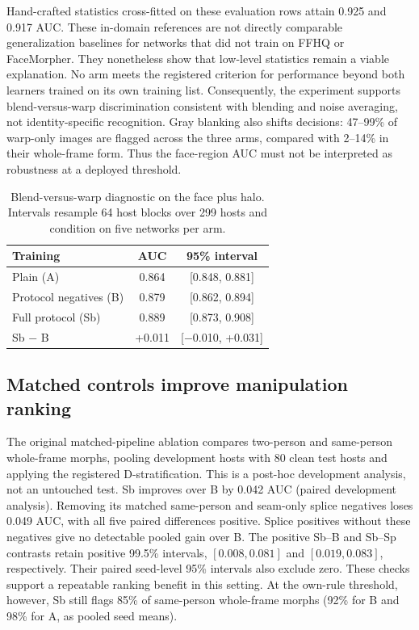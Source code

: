     Hand-crafted statistics cross-fitted on these evaluation rows attain 0.925 and 0.917 AUC. These in-domain references are not directly comparable generalization baselines for networks that did not train on FFHQ or FaceMorpher. They nonetheless show that low-level statistics remain a viable explanation. No arm meets the registered criterion for performance beyond both learners trained on its own training list. Consequently, the experiment supports blend-versus-warp discrimination consistent with blending and noise averaging, not identity-specific recognition. Gray blanking also shifts decisions: 47--99\% of warp-only images are flagged across the three arms, compared with 2--14\% in their whole-frame form. Thus the face-region AUC must not be interpreted as robustness at a deployed threshold.
    
    \begin{table}[t]
    \centering\small
    \caption{Blend-versus-warp diagnostic on the face plus halo. Intervals resample 64 host blocks over 299 hosts and condition on five networks per arm.}
    \label{tab:blend_controls}
    \begin{tabular}{lcc}
    \toprule
    Training & AUC & 95\% interval \\
    \midrule
    Plain (A) & 0.864 & [0.848, 0.881] \\
    Protocol negatives (B) & 0.879 & [0.862, 0.894] \\
    Full protocol (Sb) & 0.889 & [0.873, 0.908] \\
    \midrule
    Sb $-$ B & +0.011 & [$-$0.010, +0.031] \\
    \bottomrule
    \end{tabular}
    \end{table}
    
    \subsection{Matched controls improve manipulation ranking}
    \label{sec:training_results}
    The original matched-pipeline ablation compares two-person and same-person whole-frame morphs, pooling development hosts with 80 clean test hosts and applying the registered D-stratification. This is a post-hoc development analysis, not an untouched test. Sb improves over B by 0.042 AUC (paired development analysis). Removing its matched same-person and seam-only splice negatives loses 0.049 AUC, with all five paired differences positive. Splice positives without these negatives give no detectable pooled gain over B. The positive Sb--B and Sb--Sp contrasts retain positive 99.5\% intervals, $[0.008,0.081]$ and $[0.019,0.083]$, respectively. Their paired seed-level 95\% intervals also exclude zero. These checks support a repeatable ranking benefit in this setting. At the own-rule threshold, however, Sb still flags 85\% of same-person whole-frame morphs (92\% for B and 98\% for A, as pooled seed means).
    
